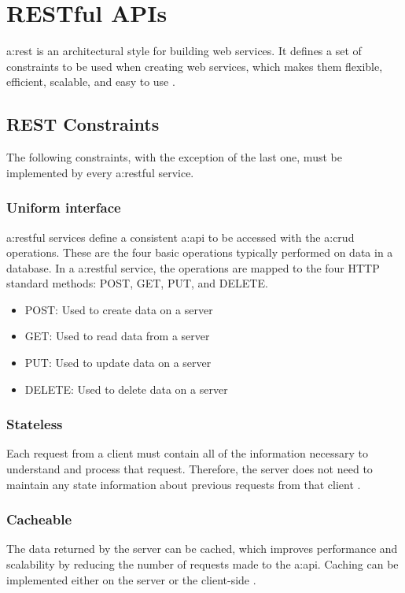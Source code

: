\section{RESTful APIs}

\gls{a:rest} is an architectural style for building web services. It defines a set of constraints to be used when creating web services, which makes them flexible, efficient, scalable, and easy to use \cite{RESTGuidelines}.

\subsection{REST Constraints}
The following constraints, with the exception of the last one, must be implemented by every \gls{a:rest}ful service.

\subsubsection{Uniform interface}
\gls{a:rest}ful services define a consistent \gls{a:api} to be accessed with the \gls{a:crud} operations. These are the four basic operations typically performed on data in a database. In a \gls{a:rest}ful service, the operations are mapped to the four HTTP standard methods: POST, GET, PUT, and DELETE.
\begin{itemize}
\item POST: Used to create data on a server
\item GET: Used to read data from a server
\item PUT: Used to update data on a server
\item DELETE: Used to delete data on a server
\end{itemize}
\subsubsection{Stateless}
Each request from a client must contain all of the information necessary to understand and process that request. Therefore, the server does not need to maintain any state information about previous requests from that client \cite{RESTGuidelines}.
\subsubsection{Cacheable}
The data returned by the server can be cached, which improves performance and scalability by reducing the number of requests made to the \gls{a:api}. Caching can be implemented either on the server or the client-side \cite{RESTGuidelines}.
